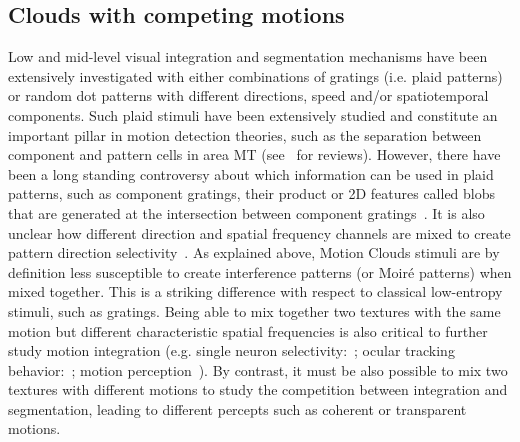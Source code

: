 \documentclass[a4paper,11pt]{article}%
\begin{document}
\subsection{Clouds with competing motions}%
Low and mid-level visual integration and segmentation mechanisms have been extensively investigated with either combinations of gratings (i.e. plaid patterns) or random dot patterns with different directions, speed and/or spatiotemporal components. Such plaid stimuli have been extensively studied and constitute an important pillar in motion detection theories, such as the separation between component and pattern cells in area MT (see~\citep{Movshon85,Burr11,Born05} for reviews). However, there have been a long standing controversy about which information can be used in plaid patterns, such as component gratings, their product or 2D features called blobs that are generated at the intersection between component gratings~\citep{Derrington04}. It is also unclear how different direction and spatial frequency channels are mixed to create pattern direction selectivity~\citep{Rust06}. As explained above, Motion Clouds stimuli are by definition less susceptible to create interference patterns (or Moir{\'e} patterns) when mixed together. This is a striking difference with respect to classical low-entropy stimuli, such as gratings. Being able to mix together two textures with the same motion but different characteristic spatial frequencies is also critical to further study motion integration (e.g. single neuron selectivity:~\citep{Rust05}; ocular tracking behavior:~\citep{Masson02}; motion perception~\citep{smith90}). By contrast, it must be also possible to mix two textures with different motions to study the competition between integration and segmentation, leading to different percepts such as coherent or transparent motions. %
\end{document}
